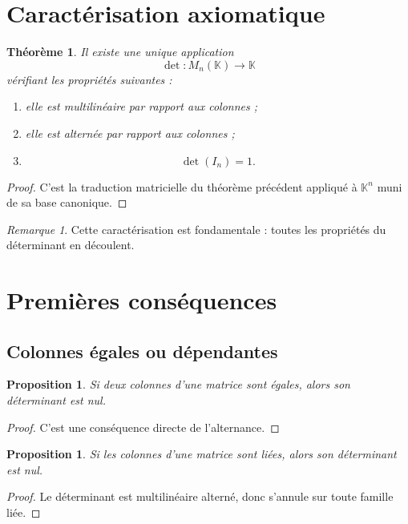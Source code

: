\documentclass[11pt,a4paper]{article}
\newtheorem{theoreme}[definition]{Théorème}
\newtheorem{proposition}[definition]{Proposition}
\theoremstyle{remark}
\newtheorem{remarque}[definition]{Remarque}
\newcommand{\K}{\mathbb{K}}
\begin{document}
\section{Caractérisation axiomatique}

\begin{theoreme}
Il existe une unique application
\[
\det:M_n(\K)\to\K
\]
vérifiant les propriétés suivantes :
\begin{enumerate}[label=\arabic*)]
    \item elle est multilinéaire par rapport aux colonnes ;
    \item elle est alternée par rapport aux colonnes ;
    \item
    \[
    \det(I_n)=1.
    \]
\end{enumerate}
\end{theoreme}

\begin{proof}
C’est la traduction matricielle du théorème précédent appliqué à \(\K^n\) muni de sa base canonique.
\end{proof}

\begin{remarque}
Cette caractérisation est fondamentale : toutes les propriétés du déterminant en découlent.
\end{remarque}

\section{Premières conséquences}

\subsection{Colonnes égales ou dépendantes}

\begin{proposition}
Si deux colonnes d’une matrice sont égales, alors son déterminant est nul.
\end{proposition}

\begin{proof}
C’est une conséquence directe de l’alternance.
\end{proof}

\begin{proposition}
Si les colonnes d’une matrice sont liées, alors son déterminant est nul.
\end{proposition}

\begin{proof}
Le déterminant est multilinéaire alterné, donc s’annule sur toute famille liée.
\end{proof}
\end{document}
